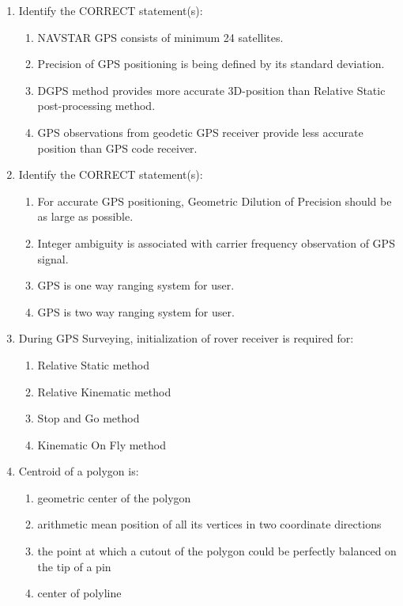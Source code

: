 \documentclass[12pt,a4paper]{article}
\begin{document}
\begin{enumerate}
\item Identify the CORRECT statement(s):
\begin{enumerate}
    \item NAVSTAR GPS consists of minimum 24 satellites.
    \item Precision of GPS positioning is being defined by its standard deviation.
    \item DGPS method provides more accurate 3D-position than Relative Static post-processing method.
    \item GPS observations from geodetic GPS receiver provide less accurate position than GPS code receiver.
\end{enumerate}

\item Identify the CORRECT statement(s):
\begin{enumerate}
    \item For accurate GPS positioning, Geometric Dilution of Precision should be as large as possible.
    \item Integer ambiguity is associated with carrier frequency observation of GPS signal.
    \item GPS is one way ranging system for user.
    \item GPS is two way ranging system for user.
\end{enumerate}

\item During GPS Surveying, initialization of rover receiver is required for:
\begin{enumerate}
    \item Relative Static method
    \item Relative Kinematic method
    \item Stop and Go method
    \item Kinematic On Fly method
\end{enumerate}

\item Centroid of a polygon is:
\begin{enumerate}
    \item geometric center of the polygon
    \item arithmetic mean position of all its vertices in two coordinate directions
    \item the point at which a cutout of the polygon could be perfectly balanced on the tip of a pin
    \item center of polyline
\end{enumerate}


\end{enumerate}
\end{document}
